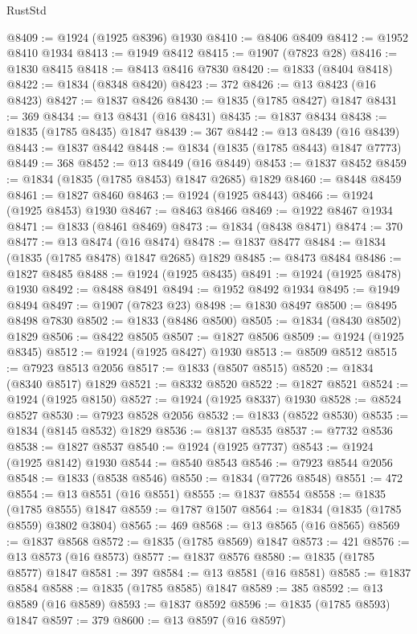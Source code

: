 \begin{lexlean}{RustStd}
\begin{coremodule}
@8409 := @1924 (@1925 @8396) @1930
@8410 := @8406 @8409
@8412 := @1952 @8410 @1934
@8413 := @1949 @8412
@8415 := @1907 (@7823 @28)
@8416 := @1830 @8415
@8418 := @8413 @8416 @7830
@8420 := @1833 (@8404 @8418)
@8422 := @1834 (@8348 @8420)
@8423 := 372
@8426 := @13 @8423 (@16 @8423)
@8427 := @1837 @8426
@8430 := @1835 (@1785 @8427) @1847
@8431 := 369
@8434 := @13 @8431 (@16 @8431)
@8435 := @1837 @8434
@8438 := @1835 (@1785 @8435) @1847
@8439 := 367
@8442 := @13 @8439 (@16 @8439)
@8443 := @1837 @8442
@8448 := @1834 (@1835 (@1785 @8443) @1847 @7773)
@8449 := 368
@8452 := @13 @8449 (@16 @8449)
@8453 := @1837 @8452
@8459 := @1834 (@1835 (@1785 @8453) @1847 @2685) @1829
@8460 := @8448 @8459
@8461 := @1827 @8460
@8463 := @1924 (@1925 @8443)
@8466 := @1924 (@1925 @8453) @1930
@8467 := @8463 @8466
@8469 := @1922 @8467 @1934
@8471 := @1833 (@8461 @8469)
@8473 := @1834 (@8438 @8471)
@8474 := 370
@8477 := @13 @8474 (@16 @8474)
@8478 := @1837 @8477
@8484 := @1834 (@1835 (@1785 @8478) @1847 @2685) @1829
@8485 := @8473 @8484
@8486 := @1827 @8485
@8488 := @1924 (@1925 @8435)
@8491 := @1924 (@1925 @8478) @1930
@8492 := @8488 @8491
@8494 := @1952 @8492 @1934
@8495 := @1949 @8494
@8497 := @1907 (@7823 @23)
@8498 := @1830 @8497
@8500 := @8495 @8498 @7830
@8502 := @1833 (@8486 @8500)
@8505 := @1834 (@8430 @8502) @1829
@8506 := @8422 @8505
@8507 := @1827 @8506
@8509 := @1924 (@1925 @8345)
@8512 := @1924 (@1925 @8427) @1930
@8513 := @8509 @8512
@8515 := @7923 @8513 @2056
@8517 := @1833 (@8507 @8515)
@8520 := @1834 (@8340 @8517) @1829
@8521 := @8332 @8520
@8522 := @1827 @8521
@8524 := @1924 (@1925 @8150)
@8527 := @1924 (@1925 @8337) @1930
@8528 := @8524 @8527
@8530 := @7923 @8528 @2056
@8532 := @1833 (@8522 @8530)
@8535 := @1834 (@8145 @8532) @1829
@8536 := @8137 @8535
@8537 := @7732 @8536
@8538 := @1827 @8537
@8540 := @1924 (@1925 @7737)
@8543 := @1924 (@1925 @8142) @1930
@8544 := @8540 @8543
@8546 := @7923 @8544 @2056
@8548 := @1833 (@8538 @8546)
@8550 := @1834 (@7726 @8548)
@8551 := 472
@8554 := @13 @8551 (@16 @8551)
@8555 := @1837 @8554
@8558 := @1835 (@1785 @8555) @1847
@8559 := @1787 @1507
@8564 := @1834 (@1835 (@1785 @8559) @3802 @3804)
@8565 := 469
@8568 := @13 @8565 (@16 @8565)
@8569 := @1837 @8568
@8572 := @1835 (@1785 @8569) @1847
@8573 := 421
@8576 := @13 @8573 (@16 @8573)
@8577 := @1837 @8576
@8580 := @1835 (@1785 @8577) @1847
@8581 := 397
@8584 := @13 @8581 (@16 @8581)
@8585 := @1837 @8584
@8588 := @1835 (@1785 @8585) @1847
@8589 := 385
@8592 := @13 @8589 (@16 @8589)
@8593 := @1837 @8592
@8596 := @1835 (@1785 @8593) @1847
@8597 := 379
@8600 := @13 @8597 (@16 @8597)

\end{coremodule}
\end{lexlean}
